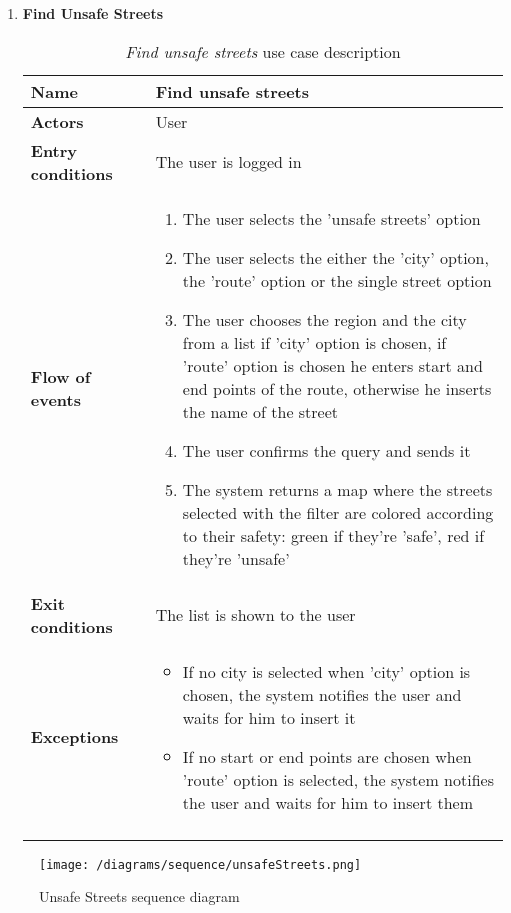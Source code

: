 \begin{enumerate}
				\FloatBarrier
			\item \textbf{Find Unsafe Streets}
				\begin{longtable}{p{0.26\linewidth}p{0.75\linewidth}}
					\toprule
					\textbf{Name} & \textbf{Find unsafe streets} \\
					\midrule
					\textbf{Actors} & User \\
					\midrule
					\textbf{Entry conditions} & The user is logged in \\
					\midrule
					\textbf{Flow of events} & 
					\begin{enumerate}
						\item The user selects the 'unsafe streets' option
						\item The user selects the either the 'city' option, the 'route' option or the single street option
						\item The user chooses the region and the city from a list if 'city' option is chosen, if 'route' option is chosen he enters start and end points of the route, otherwise he inserts the name of the street
						\item The user confirms the query and sends it
						\item The system returns a map where the streets selected with the filter are colored according to their safety: green if they're 'safe', red if they're 'unsafe'
					\end{enumerate} \\
					\midrule
					\textbf{Exit conditions} & The list is shown to the user\\
					\midrule
					\textbf{Exceptions} & 
					\begin{itemize}
						\item If no city is selected when 'city' option is chosen, the system notifies the user and waits for him to insert it
						\item If no start or end points are chosen when 'route' option is selected, the system notifies the user and waits for him to insert them
					\end{itemize} \\
					\bottomrule
					\caption{\emph{Find unsafe streets} use case description}
				\end{longtable}
		\end{enumerate}
		
		\begin{figure}[h!]
			\centering
			\texttt{[image: /diagrams/sequence/unsafeStreets.png]}
			\caption{Unsafe Streets sequence diagram}
		\end{figure}
			
